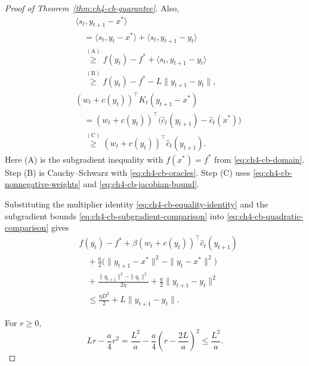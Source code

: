 \begin{proof}[Proof of Theorem~\ref{thm:ch4-cb-guarantee}]
Also,
\begin{equation}\label{eq:ch4-cb-subgradient-comparison}
\begin{aligned}
&\langle s_t,y_{t+1}-x^*\rangle\\
&\quad=\langle s_t,y_t-x^*\rangle+\langle s_t,y_{t+1}-y_t\rangle\\
&\quad\overset{\mathrm{(A)}}{\ge}f(y_t)-f^*+\langle s_t,y_{t+1}-y_t\rangle\\
&\quad\overset{\mathrm{(B)}}{\ge}f(y_t)-f^*-L\|y_{t+1}-y_t\|,\\
&(w_t+c(y_t))^\top K_t(y_{t+1}-x^*)\\
&\quad=(w_t+c(y_t))^\top\bigl(\widehat c_t(y_{t+1})-\widehat c_t(x^*)\bigr)\\
&\quad\overset{\mathrm{(C)}}{\ge}(w_t+c(y_t))^\top\widehat c_t(y_{t+1}).
\end{aligned}
\end{equation}
\nopagebreak[3]
Here (A) is the subgradient inequality with $f(x^*)=f^*$ from
\eqref{eq:ch4-cb-domain}. Step (B) is Cauchy--Schwarz with
\eqref{eq:ch4-cb-oracles}. Step (C) uses
\eqref{eq:ch4-cb-nonnegative-weights} and
\eqref{eq:ch4-cb-jacobian-bound}.

Substituting the multiplier identity \eqref{eq:ch4-cb-equality-identity}
and the subgradient bounds \eqref{eq:ch4-cb-subgradient-comparison}
into \eqref{eq:ch4-cb-quadratic-comparison} gives
\begin{equation}\label{eq:ch4-cb-primal-comparison}
\begin{aligned}
&f(y_t)-f^*+\beta(w_t+c(y_t))^\top\widehat c_t(y_{t+1})\\
&\quad+\frac a2\bigl(\|y_{t+1}-x^*\|^2-\|y_t-x^*\|^2\bigr)\\
&\quad+\frac{\|q_{t+1}\|^2-\|q_t\|^2}{2\eta}
+\frac a2\|y_{t+1}-y_t\|^2\\
&\quad\le\frac{\eta D^2}{2}+L\|y_{t+1}-y_t\|.
\end{aligned}
\end{equation}

For $r\ge0$,
\begin{equation}\label{eq:ch4-cb-square-bound}
Lr-\frac a4r^2
=\frac{L^2}{a}-\frac a4\left(r-\frac{2L}{a}\right)^2
\le\frac{L^2}{a}.
\end{equation}


\end{proof}
